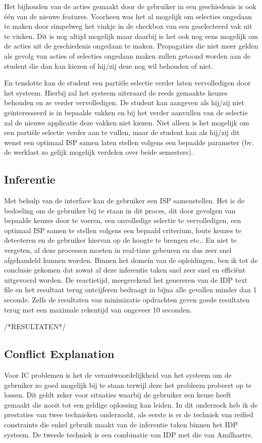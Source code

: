 Het bijhouden van de acties gemaakt door de gebruiker in een geschiedenis is ook \'{e}\'{e}n van de nieuwe features. Voorheen was het al mogelijk om selecties ongedaan te maken door simpelweg het vinkje in de checkbox van een geselecteerd vak uit te vinken. Dit is nog altijd mogelijk maar daarbij is het ook nog eens mogelijk om de acties uit de geschiedenis ongedaan te maken. Propagaties die niet meer gelden als gevolg van acties of selecties ongedaan maken zullen getoond worden aan de student die dan kan kiezen of hij/zij deze nog wil behouden of niet. 

En tenslotte kan de student een parti\"{e}le selectie verder laten vervolledigen door het systeem. Hierbij zal het systeem uiteraard de reeds gemaakte keuzes behouden en ze verder vervolledigen. De student kan aangeven als hij/zij niet ge\"{i}nteresseerd is in bepaalde vakken en bij het verder aanvullen van de selectie zal de nieuwe applicatie deze vakken niet kiezen. Niet alleen is het mogelijk om een parti\"{e}le selectie verder aan te vullen, maar de student kan als hij/zij dit wenst een optimaal ISP samen laten stellen volgens een bepaalde parameter (bv. de werklast zo gelijk mogelijk verdelen over beide semesters). 

\subsection{Inferentie} 
Met behulp van de interface kan de gebruiker een ISP samenstellen. Het is de bedoeling om de gebruiker bij te staan in dit proces, dit door gevolgen van bepaalde keuzes door te voeren, een onvolledige selectie te vervolledigen, een optimaal ISP samen te stellen volgens een bepaald criterium, foute keuzes te detecteren en de gebruiker hiervan op de hoogte te brengen etc.. En niet te vergeten, al deze processen moeten in real-time gebeuren en dus zeer snel afgehandeld kunnen worden. Binnen het domein van de opleidingen, ben ik tot de conclusie gekomen dat zowat al deze inferentie taken snel zeer snel en effici\"{e}nt uitgevoerd worden. De reactietijd, meegerekend het genereren van de IDP text file en het resultaat terug ontcijferen bedraagt in bijna alle gevallen minder dan 1 seconde. Zelfs de resultaten van minimizatie opdrachten geven goede resultaten terug met een maximale rekentijd van ongeveer 10 seconden. 

/*RESULTATEN*/

\subsection{Conflict Explanation} 
Voor IC problemen is het de verantwoordelijkheid van het systeem om de gebruiker zo goed mogelijk bij te staan terwijl deze het probleem probeert op te lossen. Dit geldt zeker voor situaties waarbij de gebruiker een keuze heeft gemaakt die nooit tot een geldige oplossing kan leiden. In dit onderzoek heb ik de prestaties van twee technieken onderzocht, als eerste is er de techniek van reified constraints die enkel gebruik maakt van de inferentie taken binnen het IDP systeem. De tweede techniek is een combinatie van IDP met die van Amilhastre.

